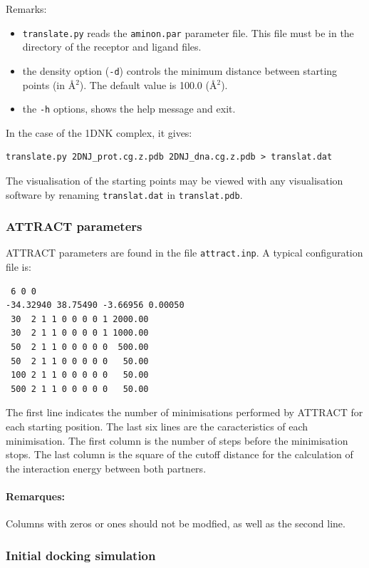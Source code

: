 \documentclass[12pt,a4paper]{article}
\begin{document}
Remarks:
\begin{itemize}
\item {\tt translate.py} reads the {\tt aminon.par} parameter file. This file must be
in the directory of the receptor and ligand files.
\item the density option ({\tt -d}) controls the minimum distance between starting
points (in \AA$^2$). The default value is 100.0 (\AA$^2$). 
\item the {\tt -h} options, shows the help message and exit.
\end{itemize}

In the case of the 1DNK complex, it gives:
\begin{verbatim}
translate.py 2DNJ_prot.cg.z.pdb 2DNJ_dna.cg.z.pdb > translat.dat
\end{verbatim}




The visualisation of the starting points may be viewed with any visualisation software by renaming {\tt translat.dat} in {\tt translat.pdb}.

\subsubsection{ATTRACT parameters}

ATTRACT parameters are found in the file {\tt attract.inp}. A typical configuration file is:
\begin{verbatim}
 6 0 0
-34.32940 38.75490 -3.66956 0.00050
 30  2 1 1 0 0 0 0 1 2000.00
 30  2 1 1 0 0 0 0 1 1000.00
 50  2 1 1 0 0 0 0 0  500.00
 50  2 1 1 0 0 0 0 0   50.00
 100 2 1 1 0 0 0 0 0   50.00
 500 2 1 1 0 0 0 0 0   50.00
\end{verbatim}

The first line indicates the number of minimisations performed by ATTRACT for each starting position. The last six lines are the caracteristics of each minimisation. The first column is the number of steps before the minimisation stops. The last column is the square of the cutoff distance for the calculation of the interaction energy between both partners.

\paragraph{Remarques:} Columns with zeros or ones should not be modfied, as well as the second line.

\subsubsection{Initial docking simulation}
\end{document}
